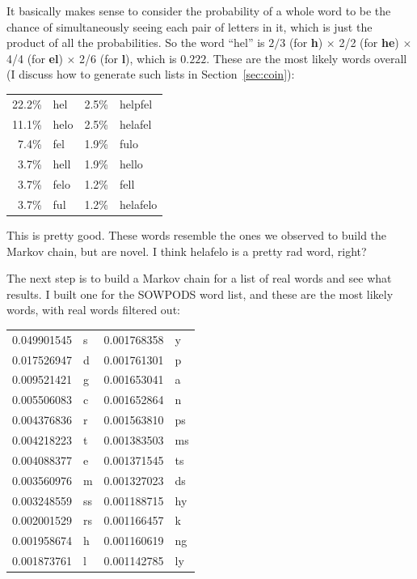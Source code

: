 \documentclass[twocolumn]{article}
\begin{document}
It basically makes sense to consider the probability of a whole word
to be the chance of simultaneously seeing each pair of letters in it,
which is just the product of all the probabilities. So the word
``hel'' is $2/3$ (for {\bf \<h}) $\times$ 2/2 (for {\bf he}) $\times$
4/4 (for {\bf el}) $\times$ 2/6 (for {\bf l\>}), which is $0.222$.
These are the most likely words overall (I discuss how to generate
such lists in Section~\ref{sec:coin}):

\vspace{0.2in}
\begin{tabular}{rl@{\quad\quad}rl}
22.2\%  &  hel      &      2.5\%  &  helpfel  \\
11.1\%  &  helo     &      2.5\%  &  helafel  \\
 7.4\%  &  fel      &      1.9\%  &  fulo     \\
 3.7\%  &  hell     &      1.9\%  &  hello    \\
 3.7\%  &  felo     &      1.2\%  &  fell     \\
 3.7\%  &  ful      &      1.2\%  &  helafelo \\
\end{tabular}
\vspace{0.2in}

This is pretty good. These words resemble the ones we observed to build
the Markov chain, but are novel. I think helafelo is a pretty rad word,
right?

The next step is to build a Markov chain for a list of real words and
see what results. I built one for the SOWPODS word list, and these
are the most likely words, with real words filtered out:

\vspace{0.2in}
\begin{tabular}{rl@{\quad\quad}rl}
0.049901545  & s     &   0.001768358  & y   \\
0.017526947  & d     &   0.001761301  & p   \\
0.009521421  & g     &   0.001653041  & a   \\
0.005506083  & c     &   0.001652864  & n   \\
0.004376836  & r     &   0.001563810  & ps  \\
0.004218223  & t     &   0.001383503  & ms  \\
0.004088377  & e     &   0.001371545  & ts  \\
0.003560976  & m     &   0.001327023  & ds  \\
0.003248559  & ss    &   0.001188715  & hy  \\
0.002001529  & rs    &   0.001166457  & k   \\
0.001958674  & h     &   0.001160619  & ng  \\
0.001873761  & l     &   0.001142785  & ly  \\
\end{tabular}
\vspace{0.2in}
\end{document}
